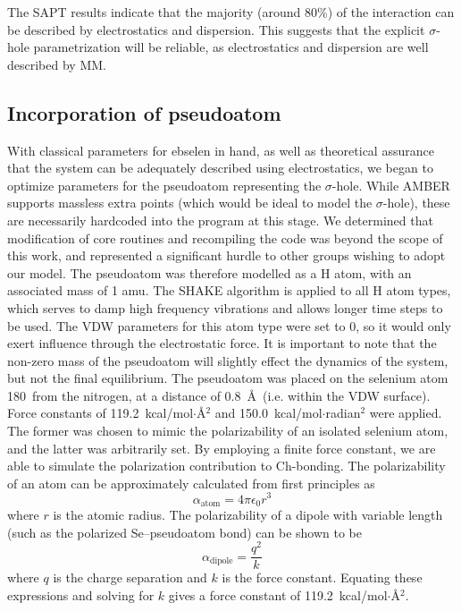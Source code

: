 \begin{refsection}
The SAPT results indicate that the majority (around 80\%) of the interaction can be described by electrostatics and dispersion.
This suggests that the explicit $\sigma$-hole parametrization will be reliable, as electrostatics and dispersion are well described by MM.

\subsection{Incorporation of pseudoatom}
With classical parameters for ebselen in hand, as well as theoretical assurance that the system can be adequately described using electrostatics, we began to optimize parameters for the pseudoatom representing the $\sigma$-hole.
While AMBER supports massless extra points (which would be ideal to model the $\sigma$-hole), these are necessarily hardcoded into the program at this stage. We determined that modification of core routines and recompiling the code was beyond the scope of this work, and represented a significant hurdle to other groups wishing to adopt our model.
The pseudoatom was therefore modelled as a H atom, with an associated mass of 1 amu.
The SHAKE algorithm is applied to all H atom types, which serves to damp high frequency vibrations and allows longer time steps to be used.
The VDW parameters for this atom type were set to 0, so it would only exert influence through the electrostatic force.
It is important to note that the non-zero mass of the pseudoatom will slightly effect the dynamics of the system, but not the final equilibrium.
The pseudoatom was placed on the selenium atom 180\degree~from the nitrogen, at a distance of 0.8~\AA~(i.e. within the VDW surface).
Force constants of 119.2~kcal/mol$\cdot$\AA$^2$ and 150.0~kcal/mol$\cdot$radian$^2$ were applied.
The former was chosen to mimic the polarizability of an isolated selenium atom, and the latter was arbitrarily set.
By employing a finite force constant, we are able to simulate the polarization contribution to Ch-bonding.
The polarizability of an atom can be approximately calculated from first principles as
\begin{equation}
\alpha_{\mathrm{atom}} = 4 \pi \epsilon_0 r^{3}
\end{equation}
where $r$ is the atomic radius.
The polarizability of a dipole with variable length (such as the polarized Se--pseudoatom bond) can be shown to be
\begin{equation}
    \alpha_{\mathrm{dipole}} = \frac{q^2}{k}
\end{equation}
where $q$ is the charge separation and $k$ is the force constant.
Equating these expressions and solving for $k$ gives a force constant of 119.2~kcal/mol$\cdot$\AA$^2$.


\end{refsection}
